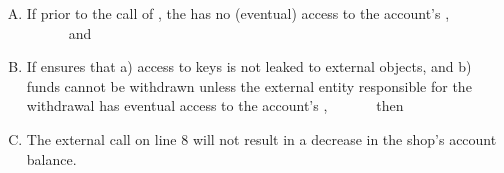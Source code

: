\vspace{.05cm}
\begin{enumerate}[(A)]
\item   If prior to the call of  , the   has no (eventual) access to the account's \password, \ \ \ \  \ \  and
\item  If \Mshop ensures that a) access to keys is not leaked to external objects, 
and b) funds cannot be withdrawn unless the external entity responsible for the withdrawal has eventual access to the account's \password,\ \ \ \  \ \ \  then 
\item  The external  call on line 8 will not result  in a decrease in the shop's account balance.
\end{enumerate}

